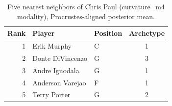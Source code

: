 \begin{table}[htbp]
  \centering\small
  \begin{tabular}{rllc}
    \toprule
    Rank & Player & Position & Archetype \\
    \midrule
    1 & Erik Murphy & C & 1 \\
    2 & Donte DiVincenzo & G & 3 \\
    3 & Andre Iguodala & G & 1 \\
    4 & Anderson Varejao & F & 1 \\
    5 & Terry Porter & G & 2 \\
    \bottomrule
  \end{tabular}
  \caption{Five nearest neighbors of Chris Paul (curvature_m4 modality), Procrustes-aligned posterior mean.}
  \label{tab:Chris_Paul_neighbors_curvature_m4}
\end{table}


